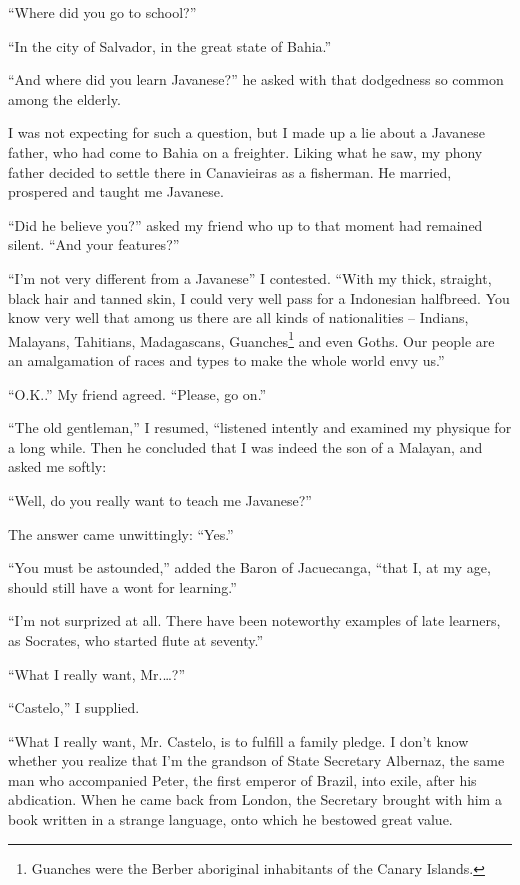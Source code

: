 \documentclass[a4paper,12pt]{book}
\begin{document}
``Where did you go to school?''

``In the city of Salvador, in the great state of Bahia.''

``And where did you learn Javanese?'' he
asked with that dodgedness so common among the elderly.

I was not expecting for such a question,
but I made up a lie about a
Javanese father, who had come to Bahia
on a freighter. Liking what he saw,
my phony father decided to
settle there in Canavieiras as a fisherman.
He married, prospered and taught me Javanese.

``Did he believe you?'' asked my friend
who up to that moment had remained silent.
``And your features?''

``I'm not very different from a Javanese''
I contested. ``With my thick, straight, black hair
and tanned skin, I could very well pass for
a Indonesian halfbreed. You know very well
that among us there are all kinds of nationalities
-- Indians, Malayans, Tahitians, Madagascans,
Guanches\footnote{Guanches were the Berber aboriginal
inhabitants of the Canary Islands.}
and even Goths. Our people are an amalgamation
of races and types to make the whole world envy us.''

``O.K..'' My friend agreed. ``Please, go on.''

``The old gentleman,''  I resumed,
``listened intently and examined my physique
for a long while. Then he concluded that I was
indeed the son of a Malayan, and asked me softly:

``Well, do you really want to teach me Javanese?''

The answer came unwittingly: ``Yes.''

``You must be astounded,'' added the Baron
of Jacuecanga, ``that I, at my age, should
still have a wont for learning.''

``I'm not surprized at all. There have been
noteworthy examples of late learners,
as Socrates, who started flute at seventy.''

``What I really want, Mr.\ldots?''

``Castelo,'' I supplied.

``What I really want, Mr. Castelo,
is to fulfill a family pledge.
I don't know whether you realize that I'm the
grandson of State Secretary Albernaz, the same
man who accompanied Peter,
the first emperor of Brazil,
into exile, after his abdication.
When he came back from London,
the Secretary brought with him a book written in a strange
language, onto which he bestowed great value.
\end{document}
